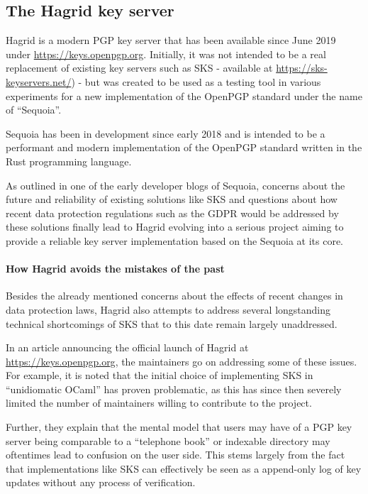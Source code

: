 \subsection{The Hagrid key server}
\label{sec:hagrid_structure}

Hagrid is a modern PGP key server that has been available since June 2019 under \url{https://keys.openpgp.org}. 
Initially, it was not intended to be a real replacement of existing key servers such as SKS - available at \url{https://sks-keyservers.net/}) - but was created to be used as a testing tool in various experiments for a new implementation of the OpenPGP standard under the name of ``Sequoia''.

Sequoia has been in development since early 2018 and is intended to be a performant and modern implementation of the OpenPGP standard written in the Rust programming language.

As outlined in one of the early developer blogs of Sequoia, concerns about the future and reliability of existing solutions like SKS and questions about how recent data protection regulations such as the GDPR would be addressed by these solutions finally lead to Hagrid evolving into a serious project aiming to provide a reliable key server implementation based on the Sequoia at its core.


\paragraph{How Hagrid avoids the mistakes of the past}
\label{sec:hagrid_solves}
Besides the already mentioned concerns about the effects of recent changes in data protection laws, Hagrid also attempts to address several longstanding technical shortcomings of SKS that to this date remain largely unaddressed.

In an article announcing the official launch of Hagrid at \url{https://keys.openpgp.org}, the maintainers go on addressing some of these issues. For example, it is noted that the initial choice of implementing SKS in ``unidiomatic OCaml'' has proven problematic, as this has since then severely limited the number of maintainers willing to contribute to the project.


Further, they explain that the mental model that users may have of a PGP key server being comparable to a ``telephone book'' or indexable directory may oftentimes lead to confusion on the user side. This stems largely from the fact that implementations like SKS can effectively be seen as a append-only log of key updates without any process of verification.  

